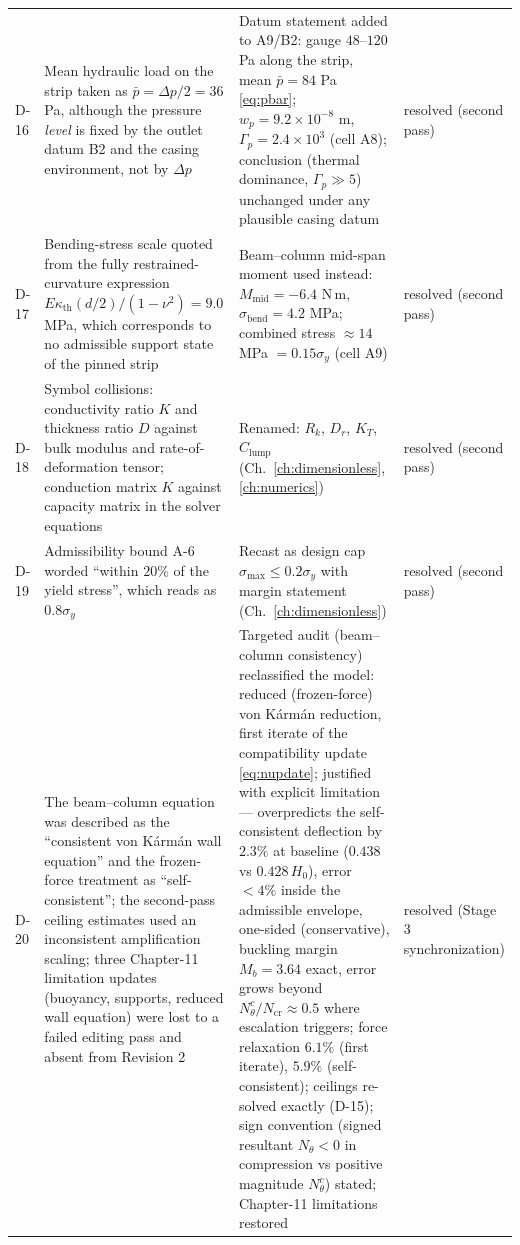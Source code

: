 \begin{longtable}{p{1cm}p{4.6cm}p{5.2cm}p{3.2cm}}
D-16 & Mean hydraulic load on the strip taken as $\bar p=\Delta p/2=36$ Pa, although the pressure \emph{level} is fixed by the outlet datum B2 and the casing environment, not by $\Delta p$ & Datum statement added to A9/B2: gauge $48$--$120$ Pa along the strip, mean $\bar p=84$ Pa \eqref{eq:pbar}; $w_p=9.2\times10^{-8}$ m, $\Gamma_p=2.4\times10^3$ (cell A8); conclusion (thermal dominance, $\Gamma_p\gg5$) unchanged under any plausible casing datum & resolved (second pass) \\
D-17 & Bending-stress scale quoted from the fully restrained-curvature expression $E\kappa_{\mathrm{th}}(d/2)/(1-\nu^2)=9.0$ MPa, which corresponds to no admissible support state of the pinned strip & Beam--column mid-span moment used instead: $M_{\mathrm{mid}}=-6.4$ N\,m, $\sigma_{\mathrm{bend}}=4.2$ MPa; combined stress $\approx14$ MPa $=0.15\sigma_y$ (cell A9) & resolved (second pass) \\
D-18 & Symbol collisions: conductivity ratio $K$ and thickness ratio $D$ against bulk modulus and rate-of-deformation tensor; conduction matrix $K$ against capacity matrix in the solver equations & Renamed: $R_k$, $D_r$, $K_T$, $C_{\mathrm{lump}}$ (Ch.~\ref{ch:dimensionless}, \ref{ch:numerics}) & resolved (second pass) \\
D-19 & Admissibility bound A-6 worded ``within $20\%$ of the yield stress'', which reads as $0.8\sigma_y$ & Recast as design cap $\sigma_{\max}\le0.2\sigma_y$ with margin statement (Ch.~\ref{ch:dimensionless}) & resolved (second pass) \\
D-20 & The beam--column equation was described as the ``consistent von K\'arm\'an wall equation'' and the frozen-force treatment as ``self-consistent''; the second-pass ceiling estimates used an inconsistent amplification scaling; three Chapter-11 limitation updates (buoyancy, supports, reduced wall equation) were lost to a failed editing pass and absent from Revision 2 & Targeted audit (beam--column consistency) reclassified the model: reduced (frozen-force) von K\'arm\'an reduction, first iterate of the compatibility update \eqref{eq:nupdate}; justified with explicit limitation --- overpredicts the self-consistent deflection by $2.3\%$ at baseline ($0.438$ vs $0.428\,H_0$), error $<4\%$ inside the admissible envelope, one-sided (conservative), buckling margin $M_b=3.64$ exact, error grows beyond $N_\theta^c/N_{\mathrm{cr}}\approx0.5$ where escalation triggers; force relaxation $6.1\%$ (first iterate), $5.9\%$ (self-consistent); ceilings re-solved exactly (D-15); sign convention (signed resultant $N_\theta<0$ in compression vs positive magnitude $N_\theta^c$) stated; Chapter-11 limitations restored & resolved (Stage 3 synchronization) \\
\bottomrule
\end{longtable}

